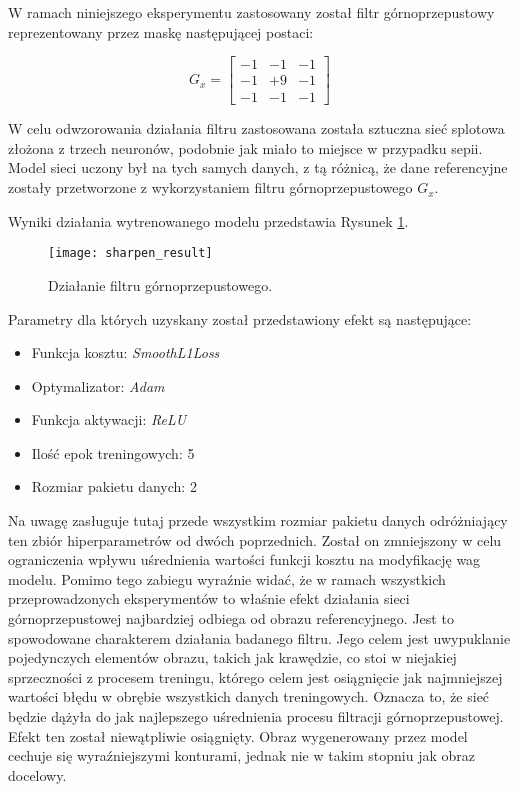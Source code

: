     W ramach niniejszego eksperymentu zastosowany został filtr górnoprzepustowy
    reprezentowany przez maskę następującej postaci:

    \begin{equation}
    G_x =
    \begin{bmatrix}
    -1 & -1 & -1 \\
    -1 & +9 & -1 \\
    -1 & -1 & -1
    \end{bmatrix}
  \end{equation}

    W celu odwzorowania działania filtru zastosowana została sztuczna sieć
    splotowa złożona z trzech neuronów, podobnie jak miało to miejsce w przypadku
    sepii. Model sieci uczony był na tych samych danych, z tą różnicą, że dane
    referencyjne zostały przetworzone z wykorzystaniem filtru górnoprzepustowego
    $G_x$.

    Wyniki działania wytrenowanego modelu przedstawia Rysunek \ref{fig:sharpen_result}.

    \begin{figure}[h!]
      \centering
      \texttt{[image: sharpen\_result]}
      \caption[Działanie filtru górnoprzepustowego - źródło: Rysunek własny]{Działanie filtru górnoprzepustowego.}
      \label{fig:sharpen_result}
    \end{figure}

    \noindent
    Parametry dla których uzyskany został przedstawiony efekt są następujące:

    \begin{itemize}
    \item Funkcja kosztu: \textit{SmoothL1Loss}
    \item Optymalizator: \textit{Adam}
    \item Funkcja aktywacji: \textit{ReLU}
    \item Ilość epok treningowych: 5
    \item Rozmiar pakietu danych: 2
    \end{itemize}

    Na uwagę zasługuje tutaj przede wszystkim rozmiar pakietu danych odróżniający
    ten zbiór hiperparametrów od dwóch poprzednich. Został on zmniejszony w celu
    ograniczenia wpływu uśrednienia wartości funkcji kosztu na modyfikację wag
    modelu. Pomimo tego zabiegu wyraźnie widać, że w ramach wszystkich przeprowadzonych
    eksperymentów to właśnie efekt działania sieci górnoprzepustowej najbardziej
    odbiega od obrazu referencyjnego. Jest to spowodowane charakterem działania
    badanego filtru. Jego celem jest uwypuklanie pojedynczych elementów obrazu, takich
    jak krawędzie, co stoi w niejakiej sprzeczności z procesem treningu, którego celem
    jest osiągnięcie jak najmniejszej wartości błędu w obrębie wszystkich danych
    treningowych. Oznacza to, że sieć będzie dążyła do jak najlepszego uśrednienia
    procesu filtracji górnoprzepustowej. Efekt ten został niewątpliwie osiągnięty.
    Obraz wygenerowany przez model cechuje się wyraźniejszymi konturami, jednak
    nie w takim stopniu jak obraz docelowy.

